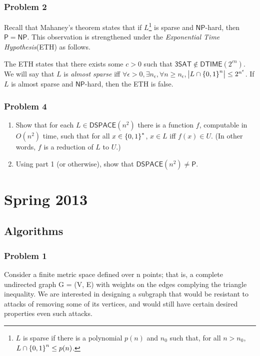 \documentclass{article}
\newcommand{\NP}{\mathsf{NP}}
\newcommand{\Pe}{\mathsf{P}}
\newcommand{\DSPACE}{\mathsf{DSPACE}}
\newcommand{\DTIME}{\mathsf{DTIME}}
\newcommand{\threeSAT}{\mathsf{3SAT}}
\begin{document}
\subsubsection{Problem 2}
Recall that Mahaney's theorem states that if \(L\)\footnote{\(L\) is sparse if there is a polynomial \(p(n)\) and \(n_0\) such that, for all \(n > n_0\), \(L \cap \set{0,1}^n \leq p(n)\).} is sparse and \(\NP\)-hard, then \(\Pe = \NP\). This observation is strengthened under the \emph{Exponential Time Hypothesis}(ETH) as follows.

The ETH states that there exists some \(c > 0\) such that \(\threeSAT \notin \DTIME(2^{cn})\). We will say that \(L\) is \emph{almost sparse} iff \(\forall \epsilon > 0, \exists n_\epsilon, \forall n \geq n_\epsilon\), \(\abs{L \cap \set{0,1}^n} \leq 2^{n^\epsilon}\). If \(L\) is almost sparse and \(\NP\)-hard, then the ETH is false.


\subsubsection{Problem 4}
\begin{enumerate}
	\item Show that for each \(L \in \DSPACE(n^2)\) there is a function \(f\), computable in \(O(n^2)\) time, such that for all \(x \in \set{0,1}^*\), \(x \in L\) iff \(f(x) \in U\). (In other words, \(f\) is a reduction of \(L\) to \(U\).)
	
	\item Using part 1 (or otherwise), show that \(\DSPACE(n^2) \neq \Pe\).
\end{enumerate}

\section{Spring 2013}
\subsection{Algorithms}
\subsubsection{Problem 1}
Consider a finite metric space defined over n points; that is, a complete undirected graph
G = (V, E) with weights on the edges complying the triangle inequality. We are interested
in designing a subgraph that would be resistant to attacks of removing some of its vertices,
and would still have certain desired properties even such attacks.
\end{document}
